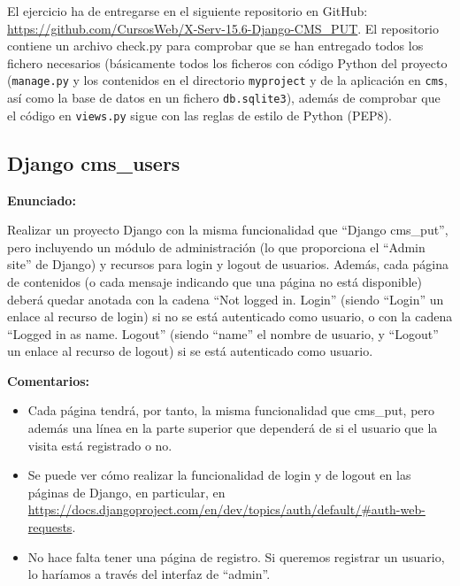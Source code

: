 El ejercicio ha de entregarse en el siguiente repositorio en GitHub: 
\url{https://github.com/CursosWeb/X-Serv-15.6-Django-CMS_PUT}. El repositorio contiene
un archivo check.py para comprobar que se han entregado todos los fichero necesarios (básicamente todos los ficheros con código Python del proyecto (\texttt{manage.py} y los contenidos en el directorio \texttt{myproject} y de la aplicación en \texttt{cms}, así como la base de datos en un fichero \texttt{db.sqlite3}), además de comprobar que el código en
\texttt{views.py} sigue con las reglas de estilo de Python (PEP8).

%

\subsection{Django cms\_users}
\label{subsec:django-users}

\textbf{Enunciado:}

Realizar un proyecto Django con la misma funcionalidad que ``Django cms\_put'', pero incluyendo un módulo de administración (lo que proporciona el ``Admin site'' de Django) y recursos para login y logout de usuarios. Además, cada página de contenidos (o cada mensaje indicando que una página no está disponible) deberá quedar anotada con la cadena ``Not logged in. Login'' (siendo ``Login'' un enlace al recurso de login) si no se está autenticado como usuario, o con la cadena ``Logged in as name. Logout'' (siendo ``name'' el nombre de usuario, y ``Logout'' un enlace al recurso de logout) si se está autenticado como usuario.

\textbf{Comentarios:}

\begin{itemize}
  \item Cada página tendrá, por tanto, la misma funcionalidad que cms\_put, pero además una línea en la parte superior que dependerá de si el usuario que la visita está registrado o no.

  \item Se puede ver cómo realizar la funcionalidad de login y de logout en las páginas de Django, en particular, en \url{https://docs.djangoproject.com/en/dev/topics/auth/default/#auth-web-requests}.

  \item No hace falta tener una página de registro. Si queremos registrar un usuario, lo haríamos a través del interfaz de ``admin''.
\end{itemize}

